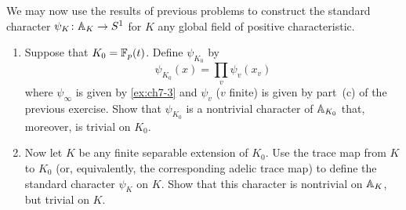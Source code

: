 
\begin{exercise}[6]
  \label{ex:ch7-6}
  We may now use the results of previous problems to construct the standard
  character $\psi_K \colon \mathbb{A}_K \to S^1$ for $K$ any global field of
  positive characteristic.
  \begin{enumerate}[label=(\alph*)]
    \item Suppose that $K_0 = \mathbb{F}_p(t)$. Define $\psi_{K_0}$ by
      \[
        \psi_{K_0}(x) = \prod_v \psi_v(x_v)
      \]
      where $\psi_\infty$ is given by \cref{ex:ch7-3} and $\psi_v$
      ($v$ finite) is given by part~(c) of the previous exercise. Show that
      $\psi_{K_0}$ is a nontrivial character of $\mathbb{A}_{K_0}$ that, moreover,
      is trivial on $K_0$.
    \item Now let $K$ be any finite separable extension of $K_0$. Use the
      trace map from $K$ to $K_0$ (or, equivalently, the corresponding adelic
      trace map) to define the standard character $\psi_K$ on $K$. Show that
      this character is nontrivial on $\mathbb{A}_K$, but trivial on $K$.
  \end{enumerate}
\end{exercise}

